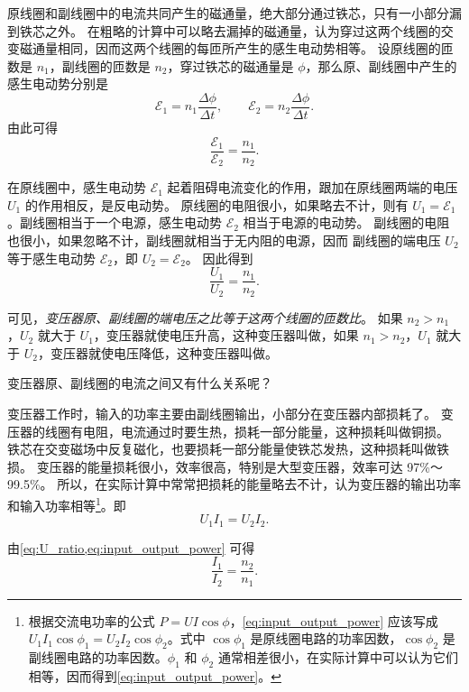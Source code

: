 原线圈和副线圈中的电流共同产生的磁通量，绝大部分通过铁芯，只有一小部分漏到铁芯之外。
在粗略的计算中可以略去漏掉的磁通量，认为穿过这两个线圈的交变磁通量相同，因而这两个线圈的每匝所产生的感生电动势相等。
设原线圈的匝数是 $n_1$，副线圈的匝数是 $n_2$，穿过铁芯的磁通量是 $\phi$，那么原、副线圈中产生的感生电动势分别是
\[\mathcal{E}_1=n_1\frac{\Delta \phi}{\Delta t},\qquad  \mathcal{E}_2=n_2\frac{\Delta \phi}{\Delta t}.\]
由此可得
\begin{equation}
    \frac{\mathcal{E}_1}{\mathcal{E}_2}=\frac{n_1}{n_2} .
\end{equation}

在原线圈中，感生电动势 $\mathcal{E}_1$ 起着阻碍电流变化的作用，跟加在原线圈两端的电压 $U_1$ 的作用相反，是反电动势。
原线圈的电阻很小，如果略去不计，则有 $U_1=\mathcal{E}_1$。副线圈相当于一个电源，感生电动势 $\mathcal{E}_2$ 相当于电源的电动势。
副线圈的电阻也很小，如果忽略不计，副线圈就相当于无内阻的电源，因而
副线圈的端电压 $U_2$ 等于感生电动势 $\mathcal{E}_2$，即 $U_2=\mathcal{E}_2$。
因此得到
\begin{equation}
  \label{eq:U_ratio}
  \frac{U_1}{U_2}=\frac{n_1}{n_2}. 
\end{equation}

可见，\emph{变压器原、副线圈的端电压之比等于这两个线圈的匝数比}。
如果 $n_2>n_1$，$U_2$ 就大于 $U_1$，变压器就使电压升高，这种变压器叫做，如果 $n_1>n_2$，$U_1$ 就大于 $U_2$，变压器就使电压降低，这种变压器叫做。

变压器原、副线圈的电流之间又有什么关系呢？

变压器工作时，输入的功率主要由副线圈输出，小部分在变压器内部损耗了。
变压器的线圈有电阻，电流通过时要生热，损耗一部分能量，这种损耗叫做铜损。
铁芯在交变磁场中反复磁化，也要损耗一部分能量使铁芯发热，这种损耗叫做铁损。
变压器的能量损耗很小，效率很高，特别是大型变压器，效率可达 97\%～99.5\%。
所以，在实际计算中常常把损耗的能量略去不计，认为变压器的输出功率和输入功率相等\footnote{根据交流电功率的公式 $P=UI\cos\phi$，\cref{eq:input_output_power} 应该写成 $U_1I_1\cos\phi_1=U_2I_2\cos\phi_2$。式中 $\cos\phi_1$ 是原线圈电路的功率因数，$\cos\phi_2$ 是副线圈电路的功率因数。$\phi_1$ 和 $\phi_2$ 通常相差很小，在实际计算中可以认为它们相等，因而得到\cref{eq:input_output_power}。}。即
\begin{equation}
  \label{eq:input_output_power}
    U_1I_1=U_2I_2.
\end{equation}

由\cref{eq:U_ratio,eq:input_output_power} 可得
\begin{equation}
  \frac{I_1}{I_2}=\frac{n_2}{n_1}.
\end{equation}

